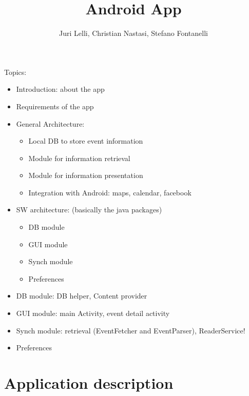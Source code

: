 \documentclass[12pt, twoside]{article}
\title{\app Android App}
\author{Juri Lelli, Christian Nastasi, Stefano Fontanelli}
\begin{document}
\maketitle

Topics:
\begin{itemize} 
    \item Introduction: about the app
    \item Requirements of the app
    \item General Architecture:
    \begin{itemize} 
        \item Local DB to store event information
        \item Module for information retrieval
        \item Module for information presentation
        \item Integration with Android: maps, calendar, facebook
    \end{itemize} 
    \item SW architecture: (basically the java packages) 
    \begin{itemize} 
        \item DB module
        \item GUI module
        \item Synch module 
        \item Preferences 
    \end{itemize} 
    \item DB module: DB helper, Content provider
    \item GUI module: main Activity, event detail activity
    \item Synch module: retrieval (EventFetcher and EventParser), ReaderService!
    \item Preferences
\end{itemize} 
\normalsize


\section{Application description}
\end{document}
